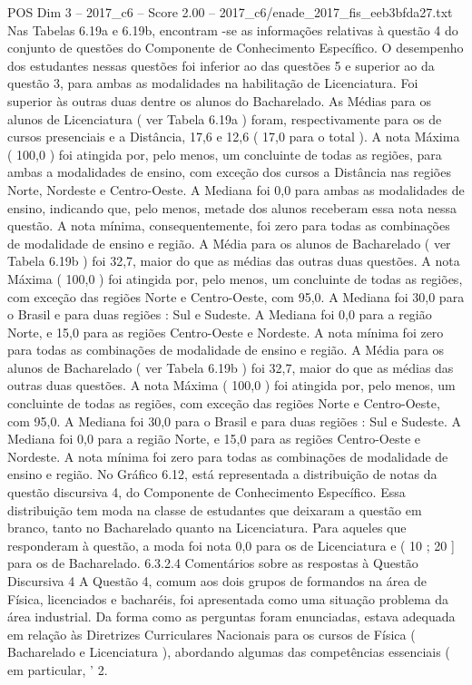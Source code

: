 \begin{textsample}{POS Dim 3 – 2017\_c6 – Score 2.00 – 2017\_c6/enade\_2017\_fis\_eeb3bfda27.txt}
Nas Tabelas 6.19a e 6.19b, encontram -se as informações relativas à questão 4 do conjunto de questões do Componente de Conhecimento Específico.
O desempenho dos estudantes nessas questões foi inferior ao das questões 5 e superior ao da questão 3, para ambas as modalidades na habilitação de Licenciatura.
Foi superior às outras duas dentre os alunos do Bacharelado.
As Médias para os alunos de Licenciatura ( ver Tabela 6.19a ) foram, respectivamente para os de cursos presenciais e a Distância, 17,6 e 12,6 ( 17,0 para o total ).
A nota Máxima ( 100,0 ) foi atingida por, pelo menos, um concluinte de todas as regiões, para ambas a modalidades de ensino, com exceção dos cursos a Distância nas regiões Norte, Nordeste e Centro-Oeste.
A Mediana foi 0,0 para ambas as modalidades de ensino, indicando que, pelo menos, metade dos alunos receberam essa nota nessa questão.
A nota mínima, consequentemente, foi zero para todas as combinações de modalidade de ensino e região.
A Média para os alunos de Bacharelado ( ver Tabela 6.19b ) foi 32,7, maior do que as médias das outras duas questões.
A nota Máxima ( 100,0 ) foi atingida por, pelo menos, um concluinte de todas as regiões, com exceção das regiões Norte e Centro-Oeste, com 95,0.
A Mediana foi 30,0 para o Brasil e para duas regiões : Sul e Sudeste.
A Mediana foi 0,0 para a região Norte, e 15,0 para as regiões Centro-Oeste e Nordeste.
A nota mínima foi zero para todas as combinações de modalidade de ensino e região.
A Média para os alunos de Bacharelado ( ver Tabela 6.19b ) foi 32,7, maior do que as médias das outras duas questões.
A nota Máxima ( 100,0 ) foi atingida por, pelo menos, um concluinte de todas as regiões, com exceção das regiões Norte e Centro-Oeste, com 95,0.
A Mediana foi 30,0 para o Brasil e para duas regiões : Sul e Sudeste.
A Mediana foi 0,0 para a região Norte, e 15,0 para as regiões Centro-Oeste e Nordeste.
A nota mínima foi zero para todas as combinações de modalidade de ensino e região.
No Gráfico 6.12, está representada a distribuição de notas da questão discursiva 4, do Componente de Conhecimento Específico.
Essa distribuição tem moda na classe de estudantes que deixaram a questão em branco, tanto no Bacharelado quanto na Licenciatura.
Para aqueles que responderam à questão, a moda foi nota 0,0 para os de Licenciatura e ( 10 ; 20 ] para os de Bacharelado. 6.3.2.4 Comentários sobre as respostas à Questão Discursiva 4 A Questão 4, comum aos dois grupos de formandos na área de Física, licenciados e bacharéis, foi apresentada como uma situação problema da área industrial.
Da forma como as perguntas foram enunciadas, estava adequada em relação às Diretrizes Curriculares Nacionais para os cursos de Física ( Bacharelado e Licenciatura ), abordando algumas das competências essenciais ( em particular, ' 2.

\end{textsample}
